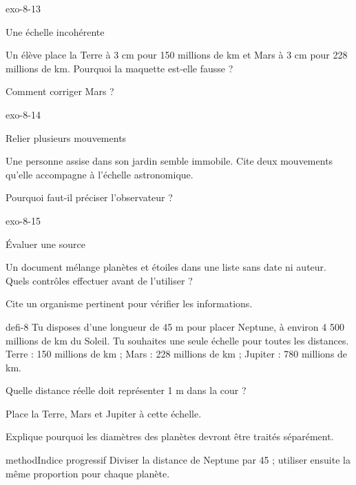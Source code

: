 \documentclass[12pt,twoside,openany]{book}
\begin{document}
\begin{blocLivre}{exo-8-13}
\begin{exercice}[3]{Une échelle incohérente}
\begin{questions}
\item Un élève place la Terre à 3 cm pour 150 millions de km et Mars à 3 cm pour 228 millions de km. Pourquoi la maquette est-elle fausse ?
\item Comment corriger Mars ?
\end{questions}
\end{exercice}\end{blocLivre}
\begin{blocLivre}{exo-8-14}
\begin{exercice}[3]{Relier plusieurs mouvements}
\begin{questions}
\item Une personne assise dans son jardin semble immobile. Cite deux mouvements qu’elle accompagne à l’échelle astronomique.
\item Pourquoi faut-il préciser l’observateur ?
\end{questions}
\end{exercice}\end{blocLivre}
\begin{blocLivre}{exo-8-15}
\begin{exercice}[3]{Évaluer une source}
\begin{questions}
\item Un document mélange planètes et étoiles dans une liste sans date ni auteur. Quels contrôles effectuer avant de l’utiliser ?
\item Cite un organisme pertinent pour vérifier les informations.
\end{questions}
\end{exercice}\end{blocLivre}
\label{defi-ex-8}
\begin{pcFiche}{defi-8}
Tu disposes d’une longueur de 45 m pour placer Neptune, à environ 4 500 millions de km du Soleil. Tu souhaites une seule échelle pour toutes les distances. Terre : 150 millions de km ; Mars : 228 millions de km ; Jupiter : 780 millions de km.\par
{}
\begin{questions}
\item Quelle distance réelle doit représenter 1 m dans la cour ?
\item Place la Terre, Mars et Jupiter à cette échelle.
\item Explique pourquoi les diamètres des planètes devront être traités séparément.
\end{questions}
\begin{pcEncadre}{method}{Indice progressif}
Diviser la distance de Neptune par 45 ; utiliser ensuite la même proportion pour chaque planète.\par
\end{pcEncadre}
\end{pcFiche}
\end{document}
